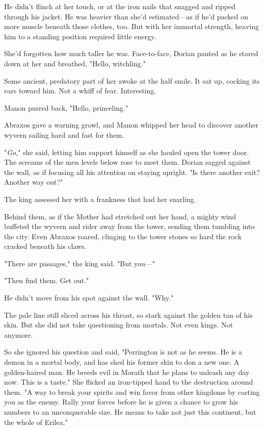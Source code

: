 He didn't flinch at her touch, or at the iron nails that snagged and ripped through his jacket. He was heavier than she'd estimated---as if he'd packed on more muscle beneath those clothes, too. But with her immortal strength, heaving him to a standing position required little energy.

She'd forgotten how much taller he was. Face-to-face, Dorian panted as he stared down at her and breathed, "Hello, witchling."

Some ancient, predatory part of her awoke at the half smile. It sat up, cocking its ears toward him. Not a whiff of fear. Interesting.

Manon purred back, "Hello, princeling."

Abraxos gave a warning growl, and Manon whipped her head to discover another wyvern sailing hard and fast for them.

"\emph{Go}," she said, letting him support himself as she hauled open the tower door. The screams of the men levels below rose to meet them. Dorian sagged against the wall, as if focusing all his attention on staying upright. "Is there another exit? Another way out?"

The king assessed her with a frankness that had her snarling.

Behind them, as if the Mother had stretched out her hand, a mighty wind buffeted the wyvern and rider away from the tower, sending them tumbling into the city. Even Abraxos roared, clinging to the tower stones so hard the rock cracked beneath his claws.

"There are passages," the king said. "But you---"

"Then find them. Get out."

He didn't move from his spot against the wall. "Why."

The pale line still sliced across his throat, so stark against the golden tan of his skin. But she did not take questioning from mortals. Not even kings. Not anymore.

So she ignored his question and said, "Perrington is not as he seems. He is a demon in a mortal body, and has shed his former skin to don a new one. A golden-haired man. He breeds evil in Morath that he plans to unleash any day now. This is a taste." She flicked an iron-tipped hand to the destruction around them. "A way to break your spirits and win favor from other kingdoms by casting you as the enemy. Rally your forces before he is given a chance to grow his numbers to an unconquerable size. He means to take not just this continent, but the whole of Erilea."

